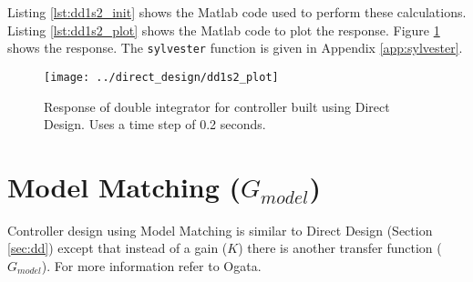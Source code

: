 \documentclass{article}
\newcommand{\sincludepdf}[2][]{
	
}
\begin{document}
\sincludepdf[pages=1,
			pagecommand=\subsection*{Example: $\dfrac{1}{s^2}$}
	]{scan/11211302.pdf}
\sincludepdf[pages=2-5]{scan/11211302.pdf}

Listing \ref{lst:dd1s2_init} shows the Matlab code used to perform
these calculations.
Listing \ref{lst:dd1s2_plot} shows the Matlab code to plot the response.
Figure \ref{fig:dd1s2_plot} shows the response.
The \verb+sylvester+ function is given in Appendix \ref{app:sylvester}.





\begin{figure}
\begin{center}
\texttt{[image: ../direct\_design/dd1s2\_plot]}
\end{center}
\caption{Response of double integrator for controller built
using Direct Design. Uses a time step of 0.2 seconds.}
\label{fig:dd1s2_plot}
\end{figure}


\clearpage
\section{Model Matching ($G_{model}$)}
\label{sec:mm}

Controller design using Model Matching is similar to Direct Design
(Section \ref{sec:dd}) except that instead of a gain ($K$) there is
another transfer function ($G_{model}$).
For more information refer to Ogata\autocite[Pg. 532]{ogata1995discrete}.
\end{document}

